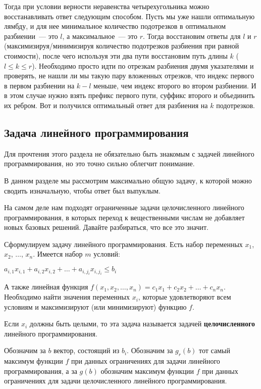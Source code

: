 Тогда при условии верности неравенства четырехугольника можно восстанавливать ответ следующим способом. Пусть мы уже нашли оптимальную лямбду, и для нее минимальное количество подотрезков в оптимальном разбиении~--- это $l$, а максимальное~--- это $r$. Тогда восстановим ответы для $l$ и $r$ (максимизируя/минимизируя количество подотрезков разбиения при равной стоимости), после чего используя эти два пути восстановим путь длины $k$ ($l \le k \le r$). Необходимо просто идти по отрезкам разбиения двумя указателями и проверять, не нашли ли мы такую пару вложенных отрезков, что индекс первого в первом разбиении на $k - l$ меньше, чем индекс второго во втором разбиении. И в этом случае нужно взять префикс первого пути, суффикс второго и объединить их ребром. Вот и получился оптимальный ответ для разбиения на $k$ подотрезков.

\subsection{Задача линейного программирования}

Для прочтения этого раздела не обязательно быть знакомым с задачей линейного программирования, но это точно сильно облегчит понимание.

В данном разделе мы рассмотрим максимально общую задачу, к которой можно сводить изначальную, чтобы ответ был выпуклым.

На самом деле нам подходят ограниченные задачи целочисленного линейного программирования, в которых переход к вещественными числам не добавляет новых базовых решений. Давайте разбираться, что все это значит.

\begin{definition}
    Сформулируем задачу линейного программирования. Есть набор переменных $x_1$, $x_2$, $\ldots$, $x_n$. Имеется набор $m$ условий:

    $a_{i, 1} x_{i, 1} + a_{i, 2} x_{i, 2} + \ldots + a_{i, j_i} x_{i, j_i} \le b_i$

    А также линейная функция $f(x_1, x_2, \ldots, x_n) = c_1 x_1 + c_2 x_2 + \ldots + c_n x_n$. Необходимо найти значения переменных $x_i$, которые удовлетворяют всем условиям и максимизируют (или минимизируют) функцию $f$.

    Если $x_i$ должны быть целыми, то эта задача называется задачей \textbf{целочисленного} линейного программирования.
\end{definition}


Обозначим за $b$ вектор, состоящий из $b_i$. Обозначим за $g_r(b)$ тот самый максимум функции $f$ при данных ограничениях для задачи линейного программирования, а за $g(b)$ обозначим максимум функции $f$ при данных ограничениях для задачи целочисленного линейного программирования.

